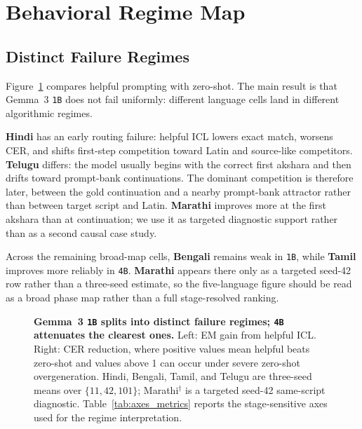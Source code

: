 \documentclass{article}
\begin{document}
\section{Behavioral Regime Map}\label{sec:behavior}

\subsection{Distinct Failure Regimes}

Figure~\ref{fig:behavior} compares helpful prompting with zero-shot. The main result is that Gemma~3 \texttt{1B} does not fail uniformly: different language cells land in different algorithmic regimes.

\textbf{Hindi} has an early routing failure: helpful ICL lowers exact match, worsens CER, and shifts first-step competition toward Latin and source-like competitors. \textbf{Telugu} differs: the model usually begins with the correct first akshara and then drifts toward prompt-bank continuations. The dominant competition is therefore later, between the gold continuation and a nearby prompt-bank attractor rather than between target script and Latin. \textbf{Marathi} improves more at the first akshara than at continuation; we use it as targeted diagnostic support rather than as a second causal case study.

Across the remaining broad-map cells, \textbf{Bengali} remains weak in \texttt{1B}, while \textbf{Tamil} improves more reliably in \texttt{4B}. \textbf{Marathi} appears there only as a targeted seed-42 row rather than a three-seed estimate, so the five-language figure should be read as a broad phase map rather than a full stage-resolved ranking.

\begin{figure}[t]
    \centering
    \resizebox{0.98\textwidth}{!}{}
    \caption{\textbf{Gemma~3 \texttt{1B} splits into distinct failure regimes; \texttt{4B} attenuates the clearest ones.} Left: EM gain from helpful ICL. Right: CER reduction, where positive values mean helpful beats zero-shot and values above 1 can occur under severe zero-shot overgeneration. Hindi, Bengali, Tamil, and Telugu are three-seed means over $\{11,42,101\}$; Marathi$^{\dagger}$ is a targeted seed-42 same-script diagnostic. Table~\ref{tab:axes_metrics} reports the stage-sensitive axes used for the regime interpretation.}
    \label{fig:behavior}
\end{figure}
\end{document}
